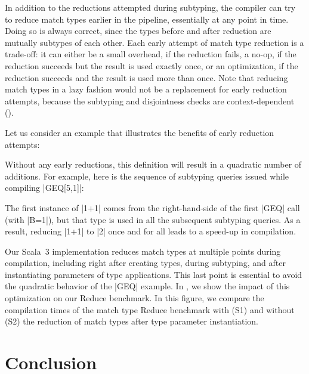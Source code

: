 In addition to the reductions attempted during subtyping, the compiler can try to reduce match types earlier in the pipeline, essentially at any point in time.
Doing so is always correct, since the types before and after reduction are mutually subtypes of each other.
Each early attempt of match type reduction is a trade-off: it can either be a small overhead, if the reduction fails, a no-op, if the reduction succeeds but the result is used exactly once, or an optimization, if the reduction succeeds and the result is used more than once.
Note that reducing match types in a lazy fashion would not be a replacement for early reduction attempts, because the subtyping and disjointness checks are context-dependent ().

Let us consider an example that illustrates the benefits of early reduction attempts:

\geqDefinition

\noindent
Without any early reductions, this definition will result in a quadratic number of additions. For example, here is the sequence of subtyping queries issued while compiling |GEQ[5,1]|:

\geqExample

\noindent
The first instance of |1+1| comes from the right-hand-side of the first |GEQ| call (with |B=1|), but that type is used in all the subsequent subtyping queries. As a result, reducing |1+1| to |2| once and for all leads to a speed-up in compilation.

Our Scala~3 implementation reduces match types at multiple points during compilation, including right after creating types, during subtyping, and after instantiating parameters of type applications.
This last point is essential to avoid the quadratic behavior of the |GEQ| example.
In , we show the impact of this optimization on our Reduce benchmark.
In this figure, we compare the compilation times of the match type Reduce benchmark with (S1) and without (S2) the reduction of match types after type parameter instantiation.


\chapter{Conclusion}
\label{chap:conclusion}


